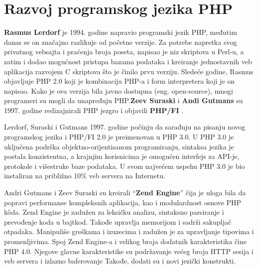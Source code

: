 \documentclass[a4paper]{article}
\begin{document}
{%



\section{Razvoj programskog jezika PHP}
\textbf{Rasmus Lerdorf} je 1994. godine napravio programski jezik PHP\cite{php}, međutim danas se on značajno razlikuje od početne verzije. Za potrebe napretka svog privatnog vebsajta i praćenja broja poseta, napisao je niz skriptova u Perl-u, a zatim i dodao mogućnost pristupa bazama podataka i kreiranje jednostavnih veb aplikacija razvojem C skriptova što je činilo prvu verziju. Sledeće godine, Rasmus objavljuje PHP 2.0 koji je kombinacija PHP-a i form interpretera koji je on napisao. Kako je ova verzija bila javno dostupna (eng. open-source), mnogi programeri su mogli da unapređuju PHP.\textbf{Zeev Suraski} i \textbf{Andi Gutmans} su 1997. godine redizajnirali PHP jezgro i objavili \textbf{PHP/FI} \cite{phpfi}.

Lerdorf, Suraski i Gutmans 1997. godine počinju da sarađuju na pisanju novog programskog jezika i PHP/FI 2.0 je preimenovan u PHP 3.0. U PHP 3.0 je uključena podrška objektno-orijentisanom programiranju, sintaksa jezika je postala konzistentna, a krajnjim korisnicima je omogućen interfejs za API-je, protokole i višestruke baze podataka. U svom najvećem uspehu PHP 3.0 je bio instaliran na približno 10\% veb servera na Internetu\cite{php}.


Andri Gutmans i Zeev Suraski su kreirali “\textbf{Zend Engine}” \cite{zend} čija je uloga bila da popravi performanse kompleksnih aplikacija, kao i modulardnost osnove PHP k\^{o}da. Zend Engine je zadužen za leksičku analizu, sintaksno parsiranje i prevođenje koda u bajtkod. Takođe upravlja memorijom i sadrži sakupljač otpadaka. Manipuliše greškama i izuzecima i zadužen je za upravljanje tipovima i promenljivima. Spoj Zend Engine-a i velikog broja dodatnih karakteristika čine PHP 4.0. Njegove glavne karakteristike su podržavanje većeg broja HTTP sesija i veb servera i izlazno baferovanje Takođe, dodati su i novi jezički konstrukti.

}
\end{document}
